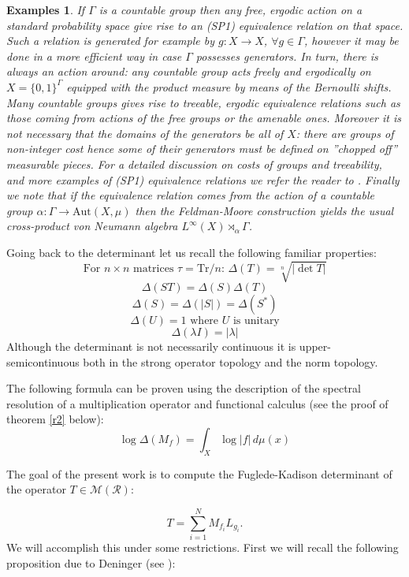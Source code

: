 \documentclass[12pt]{amsart}
\newtheorem{example}[teo]{Examples}
\numberwithin{equation}{section}
\begin{document}
\begin{example} If $\Gamma$ is a countable group then any free, ergodic action on a standard probability space give rise to an (SP1) equivalence relation on that space. Such a relation is generated for example by $g:X\rightarrow X$, $\forall g\in\Gamma$, however it may be done in a more efficient way in case $\Gamma $ possesses generators. In turn, there is always an action around: any countable group acts freely and ergodically on $X=\{0,1\}^{\Gamma}$ equipped with the product measure by means of the Bernoulli shifts. Many countable groups gives rise to treeable, ergodic equivalence relations such as those coming from actions of the free groups or the amenable ones. Moreover it is not necessary that the domains of the generators be all of $X$: there are groups of non-integer cost hence some of their generators must be defined on ''chopped off'' measurable pieces. For a detailed discussion on costs of groups and treeability, and more examples of (SP1) equivalence relations we refer the reader to \cite{Gab}. Finally we note that if the equivalence relation comes from the action of a countable group $\alpha:\Gamma\rightarrow \mbox{Aut}(X,\mu)$ then the Feldman-Moore construction yields the usual
cross-product von Neumann algebra $L^{\infty}(X)\rtimes_{\alpha}\Gamma$.
\end{example}
Going back to the determinant let us recall the following familiar properties:  \\
$$\mbox{For }  n\times n \mbox{ matrices } \tau=\mbox{Tr}/n: \, \Delta(T)=\sqrt[n]{|\det T|}$$
$$\Delta(ST)=\Delta(S)\Delta(T)$$
$$\Delta(S)=\Delta(|S|)=\Delta(S^*)$$
$$\Delta(U)=1\mbox{ where }U\mbox{ is unitary}$$
$$\Delta(\lambda I)=|\lambda|$$
Although the determinant is not necessarily continuous it is upper-semicontinuous both in the strong operator topology and the norm topology.
\par The following formula can be proven using the description of the spectral resolution of a multiplication operator and functional calculus (see the proof of theorem \ref{r2} below):
\begin{equation}\label{det of Mf}
\log \Delta (M_f) = \int_X \log|f|\, d\mu(x)
\end{equation}

The goal of the present work is to compute the Fuglede-Kadison determinant of the operator $T\in\mathcal{M(R)}$:

\begin{equation}\label{operator}
T=\sum_{i=1}^N M_{f_i}L_{g_i}.
\end{equation}
We will accomplish this under some restrictions. First we will recall the following proposition due to Deninger (see \cite{Den1}):
\end{document}

